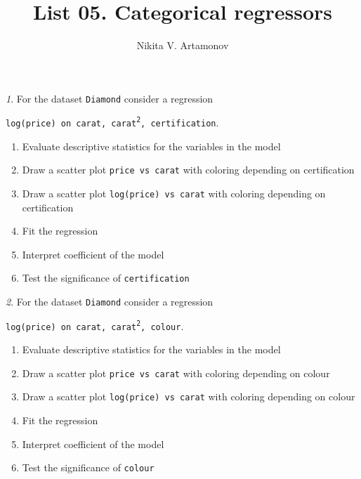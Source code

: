 \documentclass[12pt]{article}
\title{List 05. Categorical regressors}
\author{Nikita V. Artamonov}
\theoremstyle{remark}
\newtheorem{problem}{}[section]
\begin{document}
\maketitle


\begin{problem}
For the dataset \texttt{Diamond} consider a regression
\begin{center}
	\texttt{log(price) on carat, carat\textsuperscript{2}, certification}.
\end{center}
\begin{enumerate}
	\item Evaluate descriptive statistics for the variables in the model
	\item Draw a scatter plot \texttt{price vs carat} with coloring 
	depending on certification
	\item Draw a scatter plot \texttt{log(price) vs carat} with coloring 
	depending on certification
	\item Fit the regression
	\item Interpret coefficient of the model
	\item Test the significance of \texttt{certification}
\end{enumerate}
\end{problem}

\begin{problem}
For the dataset \texttt{Diamond} consider a regression
\begin{center}
	\texttt{log(price) on carat, carat\textsuperscript{2}, colour}.
\end{center}
\begin{enumerate}
	\item Evaluate descriptive statistics for the variables in the model
	\item Draw a scatter plot \texttt{price vs carat} with coloring 
	depending on colour
	\item Draw a scatter plot \texttt{log(price) vs carat} with coloring 
	depending on colour
	\item Fit the regression
	\item Interpret coefficient of the model
	\item Test the significance of \texttt{colour}
\end{enumerate}
\end{problem}
\end{document}
